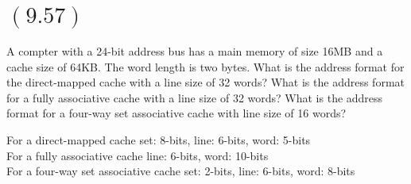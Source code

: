 \documentclass[letterpaper,12pt,titlepage]{article}
\begin{document}
\section*{$(9.57)$} A compter with a 24-bit address bus has a main memory of size 16MB and a cache size of 64KB. The word length is two bytes. What is the address format for the direct-mapped cache with a line size of 32 words? What is the address format for a fully associative cache with a line size of 32 words? What is the address format for a four-way set associative cache with line size of 16 words?

\begin{mdframed}[style=MyFrame]
For a direct-mapped cache set: 8-bits, line: 6-bits, word: 5-bits\\
For a fully associative cache  line: 6-bits, word: 10-bits \\
For a four-way set associative cache set: 2-bits, line: 6-bits, word: 8-bits
\end{mdframed}




\end{document}
